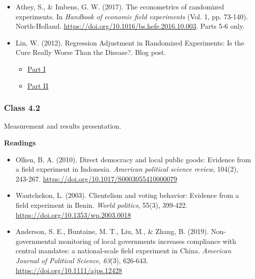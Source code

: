 \documentclass[letterpaper,12pt,parskip=full,DIV=10]{scrartcl}
\newcommand{\class}[2]{\Needspace{9\baselineskip}\subsubsection*{Class #1}\nopagebreak #2\par\nopagebreak\textbf{Readings}\par\nopagebreak}
\begin{document}
\begin{itemize}

\item Athey, S., \& Imbens, G. W. (2017). The econometrics of randomized experiments. In \emph{Handbook of economic field experiments} (Vol. 1, pp. 73-140). North-Holland. \url{https://doi.org/10.1016/bs.hefe.2016.10.003}. Parts 5-6 only.

\item Lin, W. (2012). Regression Adjustment in Randomized Experiments: Is the Cure Really Worse Than the Disease?. Blog post.

\begin{itemize}

\item \href{https://blogs.worldbank.org/impactevaluations/regression-adjustment-in-randomized-experiments-is-the-cure-really-worse-than-the-disease}{Part I}

\item \href{https://blogs.worldbank.org/impactevaluations/guest-post-by-winston-lin-regression-adjustment-in-randomized-experiments-is-the-cure-really-worse-0}{Part II}

\end{itemize}

\end{itemize}

\class{4.2}{Measurement and results presentation.}

\begin{itemize}

\item Olken, B. A. (2010). Direct democracy and local public goods: Evidence from a field experiment in Indonesia. \emph{American political science review}, 104(2), 243-267. \url{https://doi.org/10.1017/S0003055410000079}

\item Wantchekon, L. (2003). Clientelism and voting behavior: Evidence from a field experiment in Benin. \emph{World politics}, 55(3), 399-422. \url{https://doi.org/10.1353/wp.2003.0018}

\item Anderson, S. E., Buntaine, M. T., Liu, M., \& Zhang, B. (2019). Non-governmental monitoring of local governments increases compliance with central mandates: a national-scale field experiment in China. \emph{American Journal of Political Science}, \emph{63}(3), 626-643. \url{https://doi.org/10.1111/ajps.12428}

\end{itemize}
\end{document}

